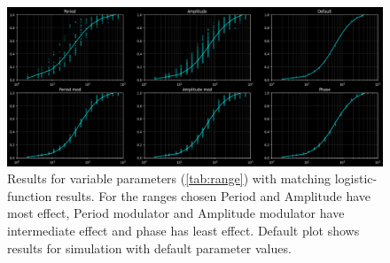\documentclass[12pt]{article}
\begin{document}
\begin{figure}[hbtp]
\centering
\includegraphics[width=\textwidth]{variable.png}
\caption{Results for variable parameters (\autoref{tab:range}) with matching logistic-function results. For the ranges chosen Period and Amplitude have most effect, Period modulator and Amplitude modulator have intermediate effect and phase has least effect. Default plot shows results for simulation with default parameter values.}
\label{fig:variable}
\end{figure}
\end{document}
